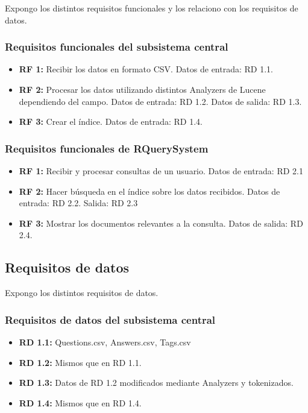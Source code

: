 Expongo los distintos requisitos funcionales y los relaciono con los requisitos de datos.

\subsubsection{Requisitos funcionales del subsistema central}

\begin{itemize}
	\item \textbf{RF 1:} Recibir los datos en formato CSV. Datos de entrada: RD 1.1.
	\item \textbf{RF 2:} Procesar los datos utilizando distintos Analyzers de Lucene dependiendo del campo. Datos de entrada: RD 1.2. Datos de salida: RD 1.3.
	\item \textbf{RF 3:} Crear el índice. Datos de entrada: RD 1.4.
\end{itemize}

\subsubsection{Requisitos funcionales de RQuerySystem}

\begin{itemize}
	\item \textbf{RF 1:} Recibir y procesar consultas de un usuario. Datos de entrada: RD 2.1
	\item \textbf{RF 2:} Hacer búsqueda en el índice sobre los datos recibidos. Datos de entrada: RD 2.2. Salida: RD 2.3
	\item \textbf{RF 3:} Mostrar los documentos relevantes a la consulta. Datos de salida: RD 2.4.
\end{itemize}

\subsection{Requisitos de datos}

Expongo los distintos requisitos de datos.

\subsubsection{Requisitos de datos del subsistema central}

\begin{itemize}
	\item \textbf{RD 1.1:} Questions.csv, Answers.csv, Tags.csv
	\item \textbf{RD 1.2:} Mismos que en RD 1.1.
	\item \textbf{RD 1.3:} Datos de RD 1.2 modificados mediante Analyzers y tokenizados.
	\item \textbf{RD 1.4:} Mismos que en RD 1.4.
\end{itemize}

